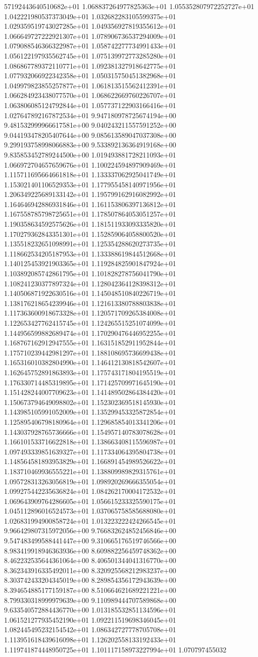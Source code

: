 57192443640510682e+01	1.068837264977825363e+01	1.055352807972252727e+01	1.042221980537373049e+01	1.032682283105599375e+01	1.029359519743027285e+01	1.049356927819355612e+01	1.066649727222921307e+01	1.078906736537294009e+01	1.079088546366322987e+01	1.058742277734991433e+01	1.056122197935562745e+01	1.075139972773285280e+01	1.086867789372110771e+01	1.092381327918642775e+01	1.077932066922342358e+01	1.050315750451382968e+01	1.049979823855257877e+01	1.061813515562412391e+01	1.066284923438077570e+01	1.068622669760226707e+01	1.063806085124792844e+01	1.057737122903166416e+01	1.027647892167872534e+01	9.947180978725674194e+00	9.481532999966617581e+00	9.040243211557591252e+00	9.044193478205407644e+00	9.085613589047037308e+00	9.299193758998066883e+00	9.533892136364919168e+00	9.835853452789244500e+00	1.019493881728211093e+01	1.066972704657659676e+01	1.100224594897909469e+01	1.115711695664661818e+01	1.133337062925041749e+01	1.153021401106529353e+01	1.177955458140971956e+01	1.206349225689133142e+01	1.195799162916082992e+01	1.164646942886931846e+01	1.161153806397136812e+01	1.167558785798725651e+01	1.178507864053051257e+01	1.190358634592575626e+01	1.181511933093335820e+01	1.170279362843351301e+01	1.152859064058800520e+01	1.135518232651098991e+01	1.125354288620273735e+01	1.118662534205187953e+01	1.133388619844512668e+01	1.140125453921903365e+01	1.119284825901847924e+01	1.103892085742861795e+01	1.101828278756041790e+01	1.108241230377897324e+01	1.128042364128398312e+01	1.140506871922630516e+01	1.145048510840226719e+01	1.138176218654239946e+01	1.121613380788803838e+01	1.117363600918673328e+01	1.120571709265384008e+01	1.122653427762415745e+01	1.124265515251074099e+01	1.144956599882689474e+01	1.170290476446952255e+01	1.168767162912947555e+01	1.163151852911952844e+01	1.175710239442981297e+01	1.188108695736699438e+01	1.165316010382804990e+01	1.146412130818542607e+01	1.162645752891863893e+01	1.175743171804195519e+01	1.176330714485319895e+01	1.171425709971645190e+01	1.151428244007709623e+01	1.141489502864384420e+01	1.150673794649098802e+01	1.152302369518145930e+01	1.143985105991052009e+01	1.135299453325872854e+01	1.125895406798180964e+01	1.129685854013341206e+01	1.143037928765736666e+01	1.154957140783078628e+01	1.166101533716622818e+01	1.138663408115596987e+01	1.097493339851639327e+01	1.117334064395804738e+01	1.148564581893953829e+01	1.166891454989526622e+01	1.183710469936555221e+01	1.138809989829315761e+01	1.095728313263056819e+01	1.098920269666355054e+01	1.099275442235636824e+01	1.084262170004172532e+01	1.069643909764286605e+01	1.056615233325590175e+01	1.045112896016524573e+01	1.037065758585688080e+01	1.026831994900858724e+01	1.013223222424266545e+01	9.966429807315972056e+00	9.766832624852456846e+00	9.547483499588441447e+00	9.310665176519746566e+00	8.983419918946363936e+00	8.609882256459748362e+00	8.462232535644361064e+00	8.406501344041316770e+00	8.362343916335492011e+00	8.320925568212983237e+00	8.303742433204345019e+00	8.289854356172943639e+00	8.394654885177159187e+00	8.510664621689221221e+00	8.799330318999979639e+00	9.110989444707589868e+00	9.633540572884436770e+00	1.013185532851134596e+01	1.061521277935452190e+01	1.092211519698346045e+01	1.082445495232154542e+01	1.086342727778705708e+01	1.113951618439616098e+01	1.126202558133192433e+01	1.119741874448950725e+01	1.101117158973227994e+01	1.070797455032